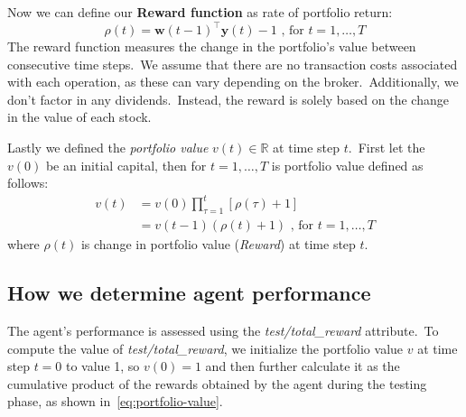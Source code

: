 \documentclass[../xlapes02]{subfiles}
\begin{document}
    Now we can define our \textbf{Reward function} as rate of portfolio return:
    \begin{equation}
        \label{eq:rate-of-portfolio-return}
        \rho(t)=\bm{w}(t-1)^\top\bm{y}(t)-1\text{ , for }t=1,\ldots,T
    \end{equation}
    The reward function measures the change in the portfolio's value between consecutive time steps.\ We assume that there are no transaction costs associated with each operation, as these can vary depending on the broker.\ Additionally, we don't factor in any dividends.\ Instead, the reward is solely based on the change in the value of each stock.

    Lastly we defined the \emph{portfolio value} $v(t) \in \mathbb{R}$ at time step $t$.\ First let the $v(0)$ be an initial capital, then for $t=1,\ldots,T$ is portfolio value defined as follows:
    \begin{equation}
        \label{eq:portfolio-value}
        \begin{split}
            v(t) &=v(0)\prod_{\tau=1}^{t}\left[\rho(\tau)+1\right]\\
            &=v(t-1)(\rho(t)+1)
            \text{ , for }t=1,\ldots,T
        \end{split}
    \end{equation}
    where $\rho(t)$ is change in portfolio value (\emph{Reward}) at time step $t$.

    \subsection{How we determine agent performance}\label{subsec:how_we_calculate_agent_performance}
    The agent's performance is assessed using the \emph{test/total\_reward} attribute.\ To compute the value of \emph{test/total\_reward}, we initialize the portfolio value $v$ at time step $t=0$ to value 1, so $v(0)=1$ and then further calculate it as the cumulative product of the rewards obtained by the agent during the testing phase, as shown in~\cref{eq:portfolio-value}.
\end{document}
